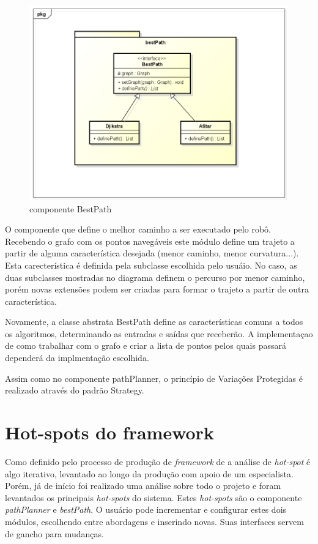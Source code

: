 \begin{figure}[h]
	\centering
	\label{fig27}
		\includegraphics[keepaspectratio=true,scale=0.5]{figuras/pkgbestPath.png}
	\caption{componente BestPath}
\end{figure}

O componente que define o melhor caminho a ser executado pelo robô. Recebendo o grafo com os pontos navegáveis este módulo define um trajeto a partir de alguma característica desejada (menor caminho, menor curvatura...). Esta carecterística é definida pela subclasse escolhida pelo usuáio. No caso, as duas subclasses mostradas no diagrama definem o percurso por menor caminho, porém novas extensões podem ser criadas para formar o trajeto a partir de outra característica.

Novamente, a classe abstrata BestPath define as características comuns a todos os algoritmos, determinando as entradas e saídas que receberão. A implementaçao de como trabalhar com o grafo e criar a lista de pontos pelos quais passará dependerá da implmentação escolhida.

Assim como no componente pathPlanner, o princípio de Variações Protegidas é realizado através do padrão Strategy.

\section{Hot-spots do framework}

Como definido pelo processo de produção de \textit{framework} de \cite{Fayad1999} a análise de \textit{hot-spot} é algo iterativo, levantado ao longo da produção com apoio de um especialista. Porém, já de início foi realizado uma análise sobre todo o projeto e foram levantados os principais \textit{hot-spots} do sistema. Estes \textit{hot-spots} são o componente \textit{pathPlanner} e \textit{bestPath}. O usuário pode incrementar e configurar estes dois módulos, escolhendo entre abordagens e inserindo novas. Suas interfaces servem de gancho para mudanças.


